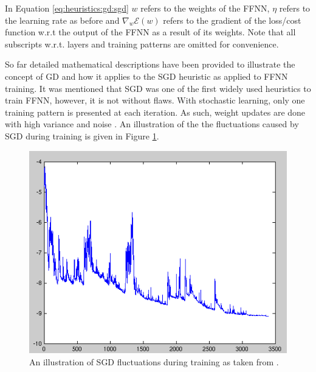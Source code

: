 In Equation \ref{eq:heuristics:gd:sgd} $w$ refers to the weights of the \ac{FFNN}, $\eta$ refers to the learning rate as before and $\nabla_{w}\mathcal{E}(w)$ refers to the gradient of the loss/cost function w.r.t the output of the \ac{FFNN} as a result of its weights. Note that all subscripts w.r.t. layers and training patterns are omitted for convenience.

So far detailed mathematical descriptions have been provided to illustrate the concept of \ac{GD} and how it applies to the \ac{SGD} heuristic as applied to \ac{FFNN} training. It was mentioned that \ac{SGD} was one of the first widely used heuristics to train \ac{FFNN}, however, it is not without flaws. With stochastic learning, only one training pattern is presented at each iteration. As such, weight updates are done with high variance and noise \cite{ref:ruder:2016}. An illustration of the the fluctuations caused by \ac{SGD} during training is given in Figure \ref{fig:heuristics:gd:sgd}.

\begin{figure}[htbp]
    \includegraphics[width=\textwidth]{images/sgd.png}
    \caption{An illustration of \ac{SGD} fluctuations during training as taken from \cite{ref:sgd:2006}.}
    \label{fig:heuristics:gd:sgd}
\end{figure}

